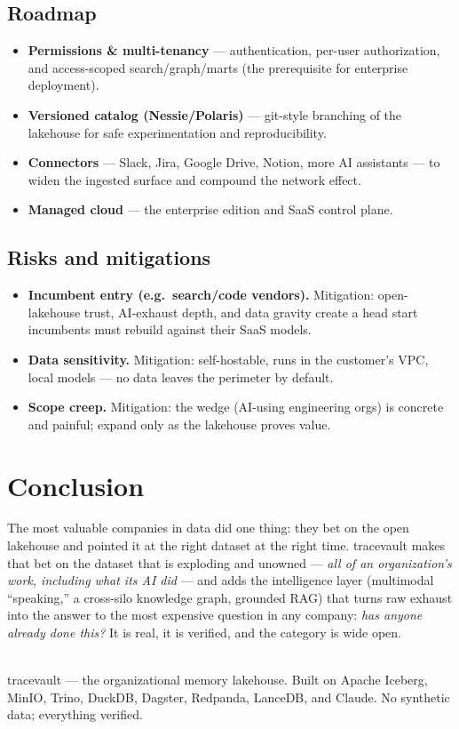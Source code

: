 \documentclass[11pt]{article}
\begin{document}
\subsection{Roadmap}
\begin{itemize}[leftmargin=1.4em,itemsep=2pt]
  \item \textbf{Permissions \& multi-tenancy} --- authentication, per-user authorization, and
  access-scoped search/graph/marts (the prerequisite for enterprise deployment).
  \item \textbf{Versioned catalog (Nessie/Polaris)} --- git-style branching of the lakehouse for safe
  experimentation and reproducibility.
  \item \textbf{Connectors} --- Slack, Jira, Google Drive, Notion, more AI assistants --- to widen the
  ingested surface and compound the network effect.
  \item \textbf{Managed cloud} --- the enterprise edition and SaaS control plane.
\end{itemize}

\subsection{Risks and mitigations}
\begin{itemize}[leftmargin=1.4em,itemsep=2pt]
  \item \textbf{Incumbent entry (e.g.\ search/code vendors).} Mitigation: open-lakehouse trust,
  AI-exhaust depth, and data gravity create a head start incumbents must rebuild against their SaaS
  models.
  \item \textbf{Data sensitivity.} Mitigation: self-hostable, runs in the customer's VPC, local models
  --- no data leaves the perimeter by default.
  \item \textbf{Scope creep.} Mitigation: the wedge (AI-using engineering orgs) is concrete and
  painful; expand only as the lakehouse proves value.
\end{itemize}

\section{Conclusion}

The most valuable companies in data did one thing: they bet on the open lakehouse and pointed it at
the right dataset at the right time. tracevault makes that bet on the dataset that is exploding and
unowned --- \emph{all of an organization's work, including what its AI did} --- and adds the
intelligence layer (multimodal ``speaking,'' a cross-silo knowledge graph, grounded RAG) that turns
raw exhaust into the answer to the most expensive question in any company: \emph{has anyone already
done this?} It is real, it is verified, and the category is wide open.

\vfill
\noindent{\color{tvrule}\rule{\linewidth}{1pt}}\\[0.3em]
{\small\color{tvmuted} tracevault --- the organizational memory lakehouse. Built on Apache Iceberg,
MinIO, Trino, DuckDB, Dagster, Redpanda, LanceDB, and Claude. No synthetic data; everything verified.}
\end{document}
